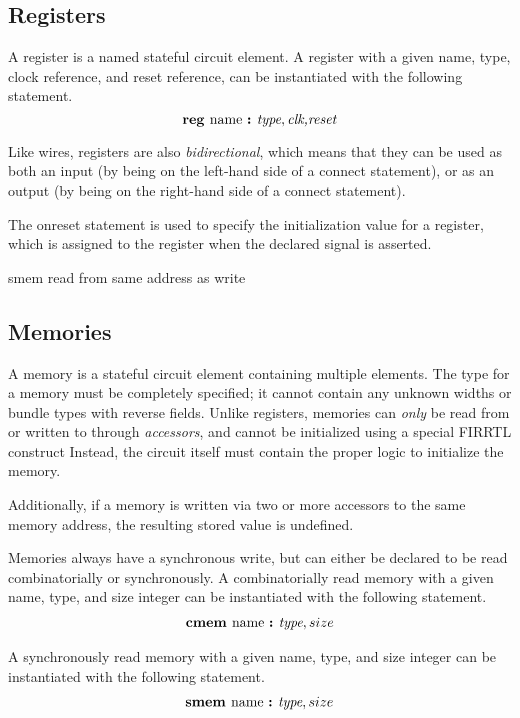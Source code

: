 \documentclass[12pt]{article}
\begin{document}
\subsection{Registers}
A register is a named stateful circuit element.
A register with a given name, type, clock reference, and reset reference, can be instantiated with the following statement.
\[
\text{\bf reg\ } \text{name } \text{\bf :\ } \text{\em type},\text{\em clk,} \text{\em reset} \\
\]

Like wires, registers are also {\em bidirectional}, which means that they can be used as both an input (by being on the left-hand side of a connect statement), or as an output (by being on the right-hand side of a connect statement). 

The onreset statement is used to specify the initialization value for a register, which is assigned to the register when the declared  signal is asserted.

smem
read from same address as write


\subsection{Memories}
A memory is a stateful circuit element containing multiple elements.
The type for a memory must be completely specified; it cannot contain any unknown widths or bundle types with reverse fields.
Unlike registers, memories can {\em only} be read from or written to through {\em accessors}, and cannot be initialized using a special FIRRTL construct 
Instead, the circuit itself must contain the proper logic to initialize the memory.

Additionally, if a memory is written via two or more accessors to the same memory address, the resulting stored value is undefined.

Memories always have a synchronous write, but can either be declared to be read combinatorially or synchronously.
A combinatorially read memory with a given name, type, and size integer can be instantiated with the following statement.
\[
\begin{aligned}
\text{\bf cmem\ } \text{name } \text{\bf :\ } \text{\em type} , size\\
\end{aligned}
\]

A synchronously read memory with a given name, type, and size integer can be instantiated with the following statement.
\[
\begin{aligned}
\text{\bf smem\ } \text{name } \text{\bf :\ } \text{\em type} , size \\
\end{aligned}
\]
\end{document}
